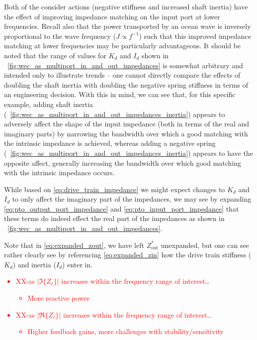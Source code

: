 \documentclass[lettersize,journal]{IEEEtran}
\newcommand{\rc}[1]{\textcolor{red}{#1}}
\begin{document}
Both of the consider actions (negative stiffness and increased shaft inertia) have the effect of improving impedance matching on the input port at lower frequencies.
Recall also that the power transported by an ocean wave is inversely proportional to the wave frequency ($J \propto f^{-1}$) such that this improved impedance matching at lower frequencies may be particularly advantageous.
It should be noted that the range of values for $K_d$ and $I_d$ shown in \figurename~\ref{fig:wec_as_multiport_in_and_out_impedances} is somewhat arbitrary and intended only to illustrate trends -- one cannot directly compare the effects of doubling the shaft inertia with doubling the negative spring stiffness in terms of an engineering decision.
With this in mind, we can see that, for this specific example, adding shaft inertia (\figurename~\ref{fig:wec_as_multiport_in_and_out_impedances_inertia}) appears to adversely affect the shape of the input impedance (both in terms of the real and imaginary parts) by narrowing the bandwidth over which a good matching with the intrinsic impedance is achieved, whereas adding a negative spring (\figurename~\ref{fig:wec_as_multiport_in_and_out_impedances_inertia}) appears to have the opposite affect, generally increasing the bandwidth over which good matching with the intrinsic impedance occurs.


While based on \eqref{eq:drive_train_impedance} we might expect changes to $K_d$ and $I_d$ to only affect the imaginary part of the impedances, we may see by expanding \eqref{eq:pto_output_port_impedance} and \eqref{eq:pto_input_port_impedance} that these terms do indeed effect the real part of the impedances as shown in \figurename~\ref{fig:wec_as_multiport_in_and_out_impedances}.

\noindent{}Note that in \eqref{eq:expanded_zout}, we have left $Z_{\textrm{out}}^*$ unexpanded, but one can see rather clearly see by referencing \eqref{eq:expanded_zin} how the drive train stiffness ($K_d$) and inertia ($I_d$) enter in.

\rc{
\begin{itemize}
        \item XX-as $| \Im \{ Z_\ell \} |$ increases within the frequency range of interest\dots{}
        \begin{itemize}
                \item More reactive power
        \end{itemize}
        \item XX-as $| \Re \{ Z_\ell \} |$ increases within the frequency range of interest\dots{}
        \begin{itemize}
                \item Higher feedback gains, more challenges with stability/sensitivity
        \end{itemize}
\end{itemize}}
\end{document}
